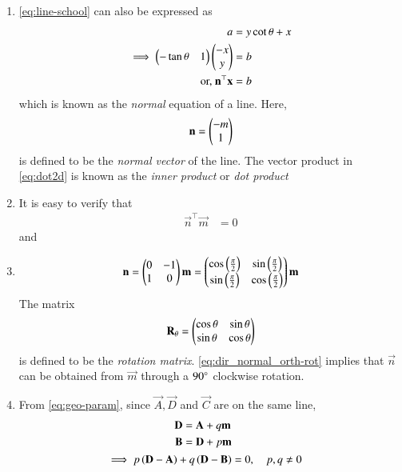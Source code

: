 \begin{enumerate}[label=\thesection.\arabic*.,ref=\thesection.\theenumi]
\item 			\eqref{eq:line-school} can also be expressed as
\begin{align}
	a &= y \cot \theta + x
	\\
\implies 	\begin{pmatrix}-\tan \theta & 1\end{pmatrix}\begin{pmatrix}-x \\ y\end{pmatrix} &= b
  \label{eq:dot2d}
	\\
	 \text{or, }\mathbf{n}^{\top}\mathbf{x} &= b
\label{eq:geo-normal}
\end{align}
		which is known as the {\em normal} equation of a line.
		Here, 
\begin{align}
	\mathbf{n} = \begin{pmatrix}-m \\ 1\end{pmatrix} 
\end{align}
		is defined to be the {\em normal vector} of the line.
The vector product in 
  \eqref{eq:dot2d}
  is known as the 
{\em inner product} or {\em dot product} 
%
\item It is easy to verify that
%
\begin{align}
\label{eq:dir_normal_orth}
\vec{n}^{\top}\vec{m} &= 0
\end{align}
%
and
\item 
%
\begin{align}
\mathbf{n} = \begin{pmatrix}0 & -1 \\ 1 & 0\end{pmatrix}\mathbf{m}
	= \begin{pmatrix}\cos\left(\frac{\pi}{2}\right) & \sin\left(\frac{\pi}{2}\right) \\  \sin\left(\frac{\pi}{2}\right)& \cos\left(\frac{\pi}{2}\right)\end{pmatrix}\mathbf{m}
\label{eq:dir_normal_orth-rot}
\end{align}
The matrix 
%
\begin{align}
	\mathbf{R}_{\theta} 
	= \begin{pmatrix}\cos	\theta & \sin	\theta \\  \sin	\theta& \cos	\theta\end{pmatrix}
\label{eq:rot}
\end{align}
is defined to be the {\em rotation matrix}.
\eqref{eq:dir_normal_orth-rot} implies that $\vec{n}$ can be obtained from $\vec{m}$ through a $90 \degree$ clockwise rotation.
  \item From \eqref{eq:geo-param}, 
	  since $\vec{A},\vec{D}$ and $\vec{C}$ are on the same line,
\begin{align}
\begin{split}
	\vec{D}&=\vec{A}+q\vec{m} 
			\\ 
			\vec{B}&=\vec{D}+p\vec{m} 
\end{split}
	\\
			\label{eq:collinear} 
			\implies 	p\brak{\vec{D}-\vec{A}} 
			+ q\brak{\vec{D}-\vec{B}} &= 0, \quad p, q \ne 0 \\ 

\end{align}
\end{enumerate}

